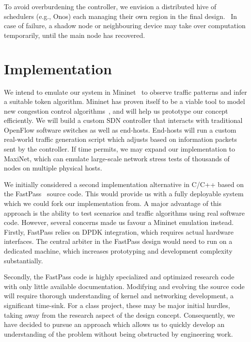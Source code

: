 \documentclass[sigconf]{acmart}
\begin{document}
To avoid overburdening the controller, we envision a distributed hive of schedulers (e.g., Onos) each managing their own region in the final design.~\cite{onos} In case of failure, a shadow node or neighbouring device may take over computation temporarily, until the main node has recovered.~\cite{disco}





\section{Implementation}
\label{sec:implementation}
We intend to emulate our system in Mininet~\cite{mininet} to observe traffic patterns and infer a suitable token algorithm. Mininet has proven itself to be a viable tool to model new congestion control algorithms~\cite{mininet_learning}, and will help us prototype our concept efficiently. We will build a custom SDN controller that interacts with traditional OpenFlow software switches as well as end-hosts. End-hosts will run a custom real-world traffic generation script which adjusts based on information packets sent by the controller. 
If time permits, we may expand our implementation to MaxiNet, which can emulate large-scale network stress tests of thousands of nodes on multiple physical hosts.

We initially considered a second implementation alternative in C/C++ based on the FastPass~\cite{fastpass} source code. This would provide us with a fully deployable system which we could fork our implementation from. A major advantage of this approach is the ability to test scenarios and traffic algorithms using real software code. 
However, several concerns made us favour a Mininet emulation instead.
Firstly, FastPass relies on DPDK integration, which requires actual hardware interfaces. The central arbiter in the FastPass design would need to run on a dedicated machine, which increases prototyping and development complexity substantially.

Secondly, the FastPass code is highly specialized and optimized research code with only little available documentation. Modifying and evolving the source code will require thorough understanding of kernel and networking development, a significant time-sink. For a class project, these may be major initial hurdles, taking away from the research aspect of the design concept.
Consequently, we have decided to pursue an approach which allows us to quickly develop an understanding of the problem without being obstructed by engineering work.
\end{document}
